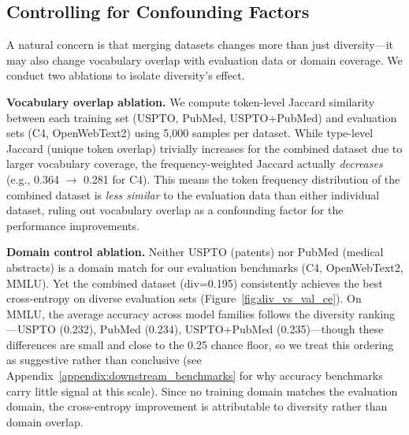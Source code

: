 \subsection{Controlling for Confounding Factors} \label{sec:confounding}
A natural concern is that merging datasets changes more than just diversity---it may also change vocabulary overlap with evaluation data or domain coverage.
We conduct two ablations to isolate diversity's effect.

\textbf{Vocabulary overlap ablation.}
We compute token-level Jaccard similarity between each training set (USPTO, PubMed, USPTO+PubMed) and evaluation sets (C4, OpenWebText2) using 5,000 samples per dataset.
While type-level Jaccard (unique token overlap) trivially increases for the combined dataset due to larger vocabulary coverage, the frequency-weighted Jaccard actually \emph{decreases} (e.g., 0.364 $\to$ 0.281 for C4).
This means the token frequency distribution of the combined dataset is \emph{less similar} to the evaluation data than either individual dataset, ruling out vocabulary overlap as a confounding factor for the performance improvements.

\textbf{Domain control ablation.}
Neither USPTO (patents) nor PubMed (medical abstracts) is a domain match for our evaluation benchmarks (C4, OpenWebText2, MMLU).
Yet the combined dataset (div=0.195) consistently achieves the best cross-entropy on diverse evaluation sets (Figure~\ref{fig:div_vs_val_ce}).
On MMLU, the average accuracy across model families follows the diversity ranking---USPTO (0.232), PubMed (0.234), USPTO+PubMed (0.235)---though these differences are small and close to the 0.25 chance floor, so we treat this ordering as suggestive rather than conclusive (see Appendix~\ref{appendix:downstream_benchmarks} for why accuracy benchmarks carry little signal at this scale).
Since no training domain matches the evaluation domain, the cross-entropy improvement is attributable to diversity rather than domain overlap.


